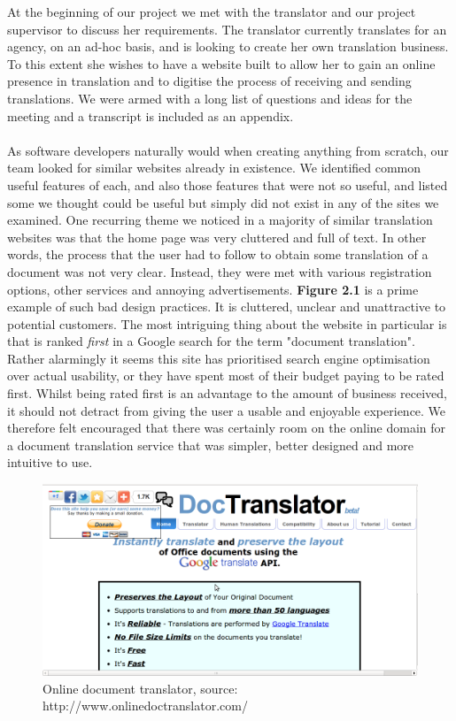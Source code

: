 \documentclass{l3proj}
\begin{document}
At the beginning of our project we met with the translator and our project
supervisor to discuss her requirements. The translator currently translates for
an agency, on an ad-hoc basis, and is looking to create her own translation
business. To this extent she wishes to have a website built to allow her to gain
an online presence in translation and to digitise the process of receiving and
sending translations. We were armed with a long list of questions and ideas for
the meeting and a transcript is included as an appendix.\\
\\
As software developers naturally would when creating anything from scratch, our
team looked for similar websites already in existence. We identified common
useful features of each, and also those features that were not so useful, and
listed some we thought could be useful but simply did not exist in any of the
sites we examined. One recurring theme we noticed in a majority of similar
translation websites was that the home page was very cluttered and full of text.
In other words, the process that the user had to follow to obtain some
translation of a document was not very clear. Instead, they were met with
various registration options, other services and annoying advertisements.
\textbf{Figure 2.1} is a prime example of such bad design practices. It is
cluttered, unclear and unattractive to potential customers. The most intriguing
thing about the website in particular is that is ranked \textit{first} in a
Google search for the term "document translation". Rather alarmingly it seems
this site has prioritised search engine optimisation over actual usability, or
they have spent most of their budget paying to be rated first. Whilst being
rated first is an advantage to the amount of business received, it should not
detract from giving the user a usable and enjoyable experience. We therefore
felt encouraged that there was certainly room on the online domain for a
document translation service that was simpler, better designed and more
intuitive to use.

\begin{figure}
\begin{center}
\includegraphics[scale=0.4]{ex1doctrans}
\caption{Online document translator, source: http://www.onlinedoctranslator.com/}
\end{center}
\end{figure}
\end{document}
